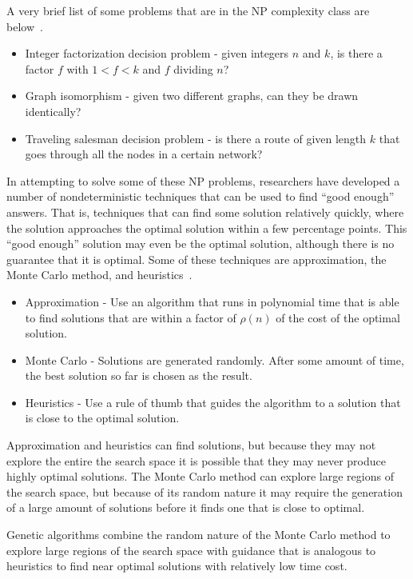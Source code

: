 A very brief list of some problems that are in the NP complexity class are
below~\cite{garey1979computers}.

\begin{itemize}
\item{Integer factorization decision problem - given integers \(n\) and \(k\),
is there a factor \(f\) with \(1 < f < k\) and \(f\) dividing \(n\)?}
\item{Graph isomorphism - given two different graphs, can they be drawn
identically?}
\item{Traveling salesman decision problem - is there a route of given length
\(k\) that goes through all the nodes in a certain network?}
\end{itemize}

In attempting to solve some of these NP problems, researchers have developed a
number of nondeterministic techniques that can be used to find ``good enough''
answers. That is, techniques that can find some solution relatively quickly,
where the solution approaches the optimal solution within a few percentage
points. This ``good enough'' solution may even be the optimal solution, although
there is no guarantee that it is optimal. Some of these techniques are
approximation, the Monte Carlo method, and
heuristics~\cite{Cormen:2009:IAT:1614191,russell2010artificial}.

\begin{itemize}
  \item {Approximation - Use an algorithm that runs in polynomial time that is
  able to find solutions that are within a factor of \(\rho (n)\) of the cost of
  the optimal solution.}
  \item {Monte Carlo - Solutions are generated randomly. After some amount of
  time, the best solution so far is chosen as the result.}
  \item {Heuristics - Use a rule of thumb that guides the algorithm to a
  solution that is close to the optimal solution.}
\end{itemize}

Approximation and heuristics can find solutions, but because they may not
explore the entire the search space it is possible that they may never produce
highly optimal solutions. The Monte Carlo method can explore large regions of
the search space, but because of its random nature it may require the
generation of a large amount of solutions before it finds one that is close to
optimal.

Genetic algorithms combine the random nature of the Monte Carlo method to
explore large regions of the search space with guidance that is analogous to
heuristics to find near optimal solutions with relatively low time cost.

